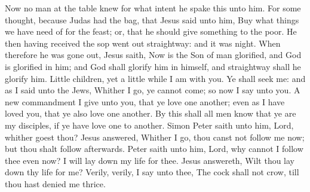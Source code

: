 Now no man at the table knew for what intent he spake this unto him. For some thought, because Judas had the bag, that Jesus said unto him, Buy what things we have need of for the feast; or, that he should give something to the poor. He then having received the sop went out straightway: and it was night.  When therefore he was gone out, Jesus saith, Now is the Son of man glorified, and God is glorified in him; and God shall glorify him in himself, and straightway shall he glorify him. Little children, yet a little while I am with you. Ye shall seek me: and as I said unto the Jews, Whither I go, ye cannot come; so now I say unto you. A new commandment I give unto you, that ye love one another; even as I have loved you, that ye also love one another. By this shall all men know that ye are my disciples, if ye have love one to another.  Simon Peter saith unto him, Lord, whither goest thou? Jesus answered, Whither I go, thou canst not follow me now; but thou shalt follow afterwards. Peter saith unto him, Lord, why cannot I follow thee even now? I will lay down my life for thee. Jesus answereth, Wilt thou lay down thy life for me? Verily, verily, I say unto thee, The cock shall not crow, till thou hast denied me thrice. 

